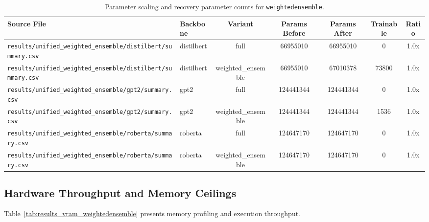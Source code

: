 \begin{table}[t]
\centering
\small
\begin{tabular}{llccccc}
\toprule
\textbf{Source File} & \textbf{Backbone} & \textbf{Variant} & \textbf{Params Before} & \textbf{Params After} & \textbf{Trainable} & \textbf{Ratio} \\
\midrule
\texttt{results/unified\_weighted\_ensemble/distilbert/summary.csv} & distilbert & full & 66955010 & 66955010 & 0 & 1.0x \\
\texttt{results/unified\_weighted\_ensemble/distilbert/summary.csv} & distilbert & weighted\_ensemble & 66955010 & 67010378 & 73800 & 1.0x \\
\texttt{results/unified\_weighted\_ensemble/gpt2/summary.csv} & gpt2 & full & 124441344 & 124441344 & 0 & 1.0x \\
\texttt{results/unified\_weighted\_ensemble/gpt2/summary.csv} & gpt2 & weighted\_ensemble & 124441344 & 124441344 & 1536 & 1.0x \\
\texttt{results/unified\_weighted\_ensemble/roberta/summary.csv} & roberta & full & 124647170 & 124647170 & 0 & 1.0x \\
\texttt{results/unified\_weighted\_ensemble/roberta/summary.csv} & roberta & weighted\_ensemble & 124647170 & 124647170 & 0 & 1.0x \\
\bottomrule
\end{tabular}
\caption{Parameter scaling and recovery parameter counts for \texttt{weightedensemble}.}
\label{tab:results_params_weightedensemble}
\end{table}

\subsection{Hardware Throughput and Memory Ceilings}
Table~\ref{tab:results_vram_weightedensemble} presents memory profiling and execution throughput.

